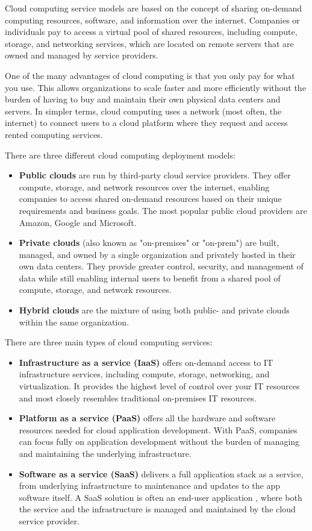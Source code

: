 	Cloud computing service models are based on the concept of sharing on-demand computing resources, software, and information over the internet. 
	Companies or individuals pay to access a virtual pool of shared resources, including compute, storage, and networking services, which are located on
	remote servers that are owned and managed by service providers. 

	One of the many advantages of cloud computing is that you only pay for what you use. This allows organizations to scale faster and more efficiently 
	without the burden of having to buy and maintain their own physical data centers and servers.  
	In simpler terms, cloud computing uses a network (most often, the internet) to connect users to a cloud platform where they request and access 
	rented computing services.

	There are three different cloud computing deployment models:
	\begin{itemize}
		\item \textbf{Public clouds} are run by third-party cloud service providers. They offer compute, storage, and network resources over the internet, 
		enabling companies to access shared on-demand resources based on their unique requirements and business goals.
		The most popular public cloud providers are Amazon, Google and Microsoft.
		\item \textbf{Private clouds} (also known as "on-premises" or "on-prem") are built, managed, and owned by a single organization 
		and privately hosted in their own data centers.
		They provide greater control, security, and management of data while still 
		enabling internal users to benefit from a shared pool of compute, storage, and network resources.
		\item \textbf{Hybrid clouds} are the mixture of using both public- and private clouds within the same organization.
	\end{itemize}

	There are three main types of cloud computing services:
	\begin{itemize}
		\item \textbf{Infrastructure as a service (IaaS)} offers on-demand access to IT infrastructure services, 
		including compute, storage, networking, and virtualization. It provides the highest level of control over your IT 
		resources and most closely resembles traditional on-premises IT resources.
		\item \textbf{Platform as a service (PaaS)} offers all the hardware and software resources needed for cloud 
		application development. With PaaS, companies can focus fully on application development without 
		the burden of managing and maintaining the underlying infrastructure.
		\item \textbf{Software as a service (SaaS)} delivers a full application stack as a service, from underlying 
		infrastructure to maintenance and updates to the app software itself. A SaaS solution is often an end-user application
		, where both the service and the infrastructure is managed and maintained by the cloud service provider.
	\end{itemize}

